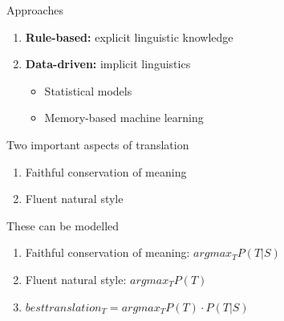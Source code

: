 \documentclass[compress]{beamer}
\begin{document}
\begin{frame}
	\begin{block}{Approaches}
		\begin{enumerate}
			\item \textbf{Rule-based:} explicit linguistic knowledge
			\item \textbf{Data-driven:} implicit linguistics	
			\begin{itemize}
				\item Statistical models
				\item Memory-based machine learning
			\end{itemize}						
		\end{enumerate}
	\end{block}

	\begin{block}{Two important aspects of translation}
		\begin{enumerate}
			\item Faithful conservation of meaning
			\item Fluent natural style
		\end{enumerate}
	\end{block}

	\begin{block}{These can be modelled}
		\begin{enumerate}
			\item Faithful conservation of meaning: $argmax_T P(T|S)$
			\item Fluent natural style: $argmax_T P(T)$
			\item $besttranslation_T = argmax_T P(T) \cdot P(T|S)$
		\end{enumerate}
	\end{block}
\end{frame}
\end{document}
